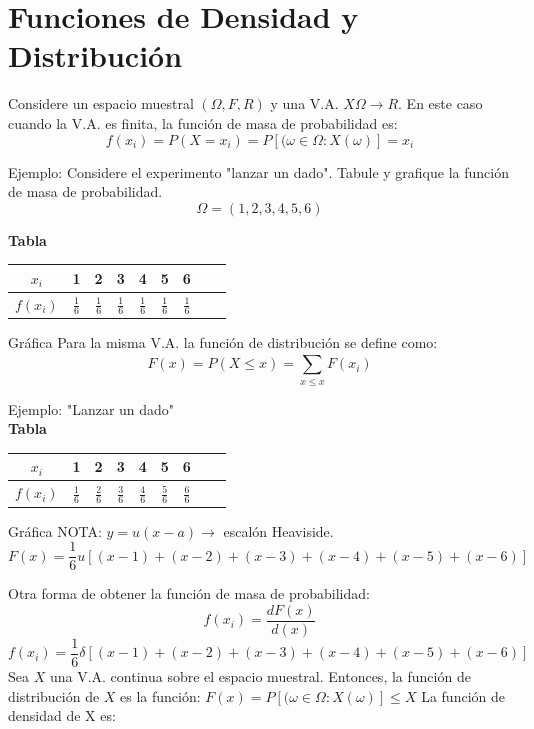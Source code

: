 \documentclass[11pt,fleqn]{book} %
\numberwithin{equation}{section} %
\numberwithin{figure}{section} %
\numberwithin{table}{section} %
\begin{document}
\section{Funciones de Densidad y Distribución}
Considere un espacio muestral $(\Omega,F,R)$ y una V.A. $X \Omega \rightarrow R $. En este caso cuando la V.A. es finita, la función de masa de probabilidad es:
$$f(x_i) = P( X = x_i )= P[(\omega \in \Omega : X(\omega)] = x_i $$

Ejemplo: Considere el experimento "lanzar un dado". Tabule y grafique la función de masa de probabilidad.
$$\Omega = (1, 2, 3, 4, 5, 6)$$

\textbf{Tabla}

\begin{center}
\begin{tabular}{ |c|c|c|c|c|c|c|c|c| } 
 \hline
 \(x_i\) & 1 & 2 & 3 & 4 & 5 & 6  \\ 
 \hline
 \(f(x_i)\) & \( \frac{1}{6} \) & \( \frac{1}{6} \) & \( \frac{1}{6} \) & \( \frac{1}{6} \)& \( \frac{1}{6} \) & \( \frac{1}{6} \) \\ 
 \hline
\end{tabular}
\end{center}

Gráfica
Para la misma V.A. la función de distribución se define como:
$$F(x) = P ( X \leq x ) = \sum_{x\leq x}^{} F(x_{i})$$

Ejemplo: "Lanzar un dado"
\ \\%
\textbf{Tabla}
\begin{center}
\begin{tabular}{ |c|c|c|c|c|c|c|c|c| } 
 \hline
 \(x_i\) & 1 & 2 & 3 & 4 & 5 & 6  \\ 
 \hline
 \(f(x_i)\) & \( \frac{1}{6} \) & \( \frac{2}{6} \) & \( \frac{3}{6} \) & \( \frac{4}{6} \)& \( \frac{5}{6} \) & \( \frac{6}{6} \) \\ 
 \hline
\end{tabular}
\end{center}

Gráfica
NOTA: $ y = u(x - a) \rightarrow$ escalón Heaviside.
$$F(x) =  \frac{1}{6}  u [ (x - 1) + (x - 2) + (x - 3) + (x - 4) + (x - 5) + (x - 6) ]$$

Otra forma de obtener la función de masa de probabilidad:
$$f(x_i) =  \frac{dF(x)}{d(x)} $$
$$f(x_i) = \frac{1}{6}  \delta [ (x - 1) + (x - 2) + (x - 3) + (x - 4) + (x - 5) + (x - 6)]$$
Sea $X$ una V.A. continua sobre el espacio muestral. Entonces, la función de distribución de $X$ es la función:
$F(x) = P [(\omega \in \Omega : X(\omega)] \leq X $
La función de densidad de X es:
\end{document}
